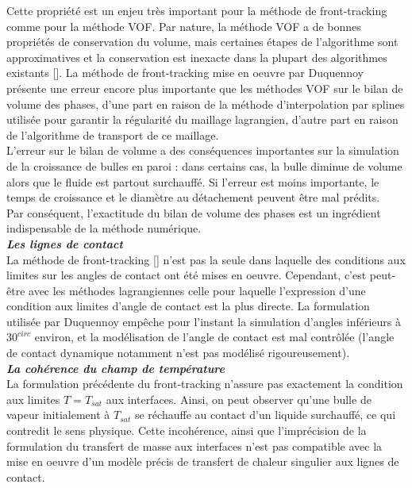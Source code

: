 Cette propri\'et\'e est un enjeu tr\`es important pour la m\'ethode de front-tracking comme pour la m\'ethode VOF. Par nature, la m\'ethode VOF a de bonnes propri\'et\'es de conservation du volume, mais certaines \'etapes de l’algorithme sont approximatives et la conservation est inexacte dans la plupart des algorithmes existants [\cite{Aulisa2003}]. La m\'ethode de front-tracking mise en oeuvre par Duquennoy pr\'esente une erreur encore plus importante que les m\'ethodes VOF sur le bilan de volume des phases, d’une part en raison de la m\'ethode d’interpolation par splines utilis\'ee pour garantir la r\'egularit\'e du maillage lagrangien, d’autre part en raison de l’algorithme de transport de ce maillage.\\
L’erreur sur le bilan de volume a des cons\'equences importantes sur la simulation de la croissance de bulles en paroi : dans certains cas, la bulle diminue de volume alors que le fluide est partout surchauff\'e. Si l’erreur est moins importante, le temps de croissance et le diam\`etre au d\'etachement peuvent \^etre mal pr\'edits.\\
Par cons\'equent, l’exactitude du bilan de volume des phases est un ingr\'edient indispensable de la m\'ethode num\'erique.\smallskip \\

\textit{\textbf{Les lignes de contact}}\smallskip \\

La m\'ethode de front-tracking [\cite{Duquennoy2000}] n’est pas la seule dans laquelle des conditions aux limites sur les angles de contact ont \'et\'e mises en oeuvre. Cependant, c’est peut-\^etre avec les m\'ethodes lagrangiennes celle pour laquelle l’expression d’une condition aux limites d’angle de contact est la plus directe. La formulation utilis\'ee par Duquennoy emp\^eche pour l’instant la simulation d’angles inf\'erieurs à $30^{circ}$ environ, et la mod\'elisation de l’angle de contact est mal contrôl\'ee (l’angle de contact dynamique notamment n’est pas mod\'elis\'e rigoureusement). \smallskip \\

\textit{\textbf{La coh\'erence du champ de temp\'erature}}\smallskip \\

La formulation pr\'ec\'edente du front-tracking n’assure pas exactement la
condition aux limites $T = T_{sat}$ aux interfaces. Ainsi, on peut observer qu’une
bulle de vapeur initialement à $T_{sat}$ se r\'echauffe au contact d’un liquide surchauff\'e, ce qui contredit le sens physique. Cette incoh\'erence, ainsi que l’impr\'ecision de la formulation du transfert de masse aux interfaces n’est pas compatible avec la mise en oeuvre d’un modèle pr\'ecis de transfert de chaleur singulier aux lignes de contact.

